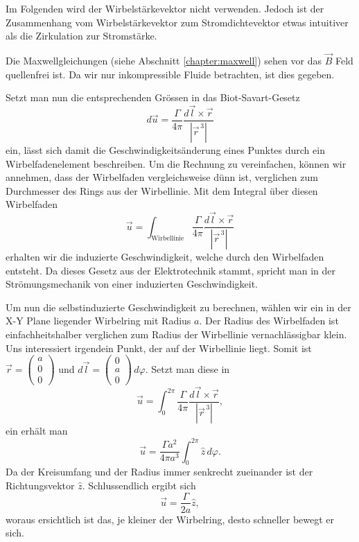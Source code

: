 Im Folgenden wird der Wirbelstärkevektor nicht verwenden.
Jedoch ist der Zusammenhang vom Wirbelstärkevektor zum Stromdichtevektor etwas intuitiver als die Zirkulation zur Stromstärke.

Die Maxwellgleichungen (siehe Abschnitt \ref{chapter:maxwell}) sehen vor das \(\vec{B}\) Feld quellenfrei ist. 
Da wir nur inkompressible Fluide betrachten, ist dies gegeben.

Setzt man nun die entsprechenden Grössen in das Biot-Savart-Gesetz
\[
d\vec{u}
=
\frac{\Gamma}{4\pi}\frac{d\vec{l} \times \vec{r}}{\left\lvert \vec{r}^{\,3}\right\rvert }
\]
ein, lässt sich damit die Geschwindigkeitsänderung eines Punktes durch ein Wirbelfadenelement beschreiben.
Um die Rechnung zu vereinfachen, können wir annehmen, dass der Wirbelfaden vergleichsweise dünn ist, verglichen zum Durchmesser des Rings aus der Wirbellinie.
Mit dem Integral über diesen Wirbelfaden
\[
\vec{u}
=
\int_{\text{Wirbellinie}} \frac{\Gamma}{4\pi}\frac{d\vec{l} \times \vec{r}}{\left\lvert \vec{r}^{\,3}\right\rvert}
\]
erhalten wir die induzierte Geschwindigkeit, welche durch den Wirbelfaden entsteht.
Da dieses Gesetz aus der Elektrotechnik stammt, spricht man in der Strömungsmechanik von einer induzierten Geschwindigkeit.

Um nun die selbstinduzierte Geschwindigkeit zu berechnen, wählen wir ein in der X-Y Plane liegender Wirbelring mit Radius \(a\).
Der Radius des Wirbelfaden ist einfachheitshalber verglichen zum Radius der Wirbellinie vernachlässigbar klein.
Uns interessiert irgendein Punkt, der auf der Wirbellinie liegt.
Somit ist
\(
\vec{r} = 
\begin{pmatrix}
    a\\
    0\\
    0    
\end{pmatrix}\)
und
\(
d\vec{l} = 
\begin{pmatrix}
    0\\
    a\\
    0    
\end{pmatrix}
\,d\varphi \). 
Setzt man diese in
\[
\vec{u}
=
\int_{0}^{2\pi} \frac{\Gamma }{4\pi}\frac{d \vec{l} \times \vec{r}}{\left\lvert \vec{r}^{\,3}\right\rvert },
\]
ein erhält man 
\[
\vec{u}
=
\frac{\Gamma a^{2}}{4\pi a^{3}} \int_{0}^{2\pi} \hat{z}\, d\varphi.
\]
Da der Kreisumfang und der Radius immer senkrecht zueinander ist der Richtungsvektor \(\hat{z}\). 
Schlussendlich ergibt sich
\[
\vec{u}
=
\frac{\Gamma }{2 a}\hat{z},
\]
woraus ersichtlich ist das, je kleiner der Wirbelring, desto schneller bewegt er sich.

